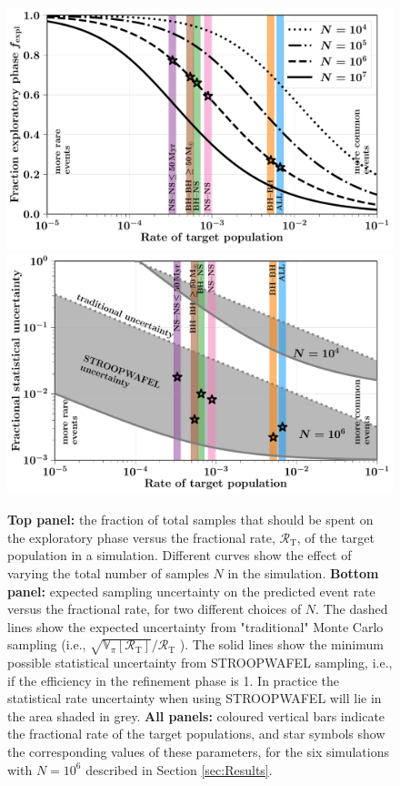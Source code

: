 \documentclass[a4paper,fleqn,usenatbib,useAMS,usedcolumn]{mnras}
\newcommand\rate{\mathcal{R}}
\newcommand{\AISs}{\textsc{STROOPWAFEL}}
\begin{document}
%
\begin{figure}
	\includegraphics[width=1\columnwidth]{AnalyticalFpriorIterated.pdf}
	\includegraphics[width=1\columnwidth]{AnalyticalFpriorIteratedUncertaintyCOMBINED.pdf}%
	    \caption{  	    
	    \textbf{Top panel:} the fraction of total samples that should be spent on the exploratory phase versus the fractional rate, $\rate_{\text{T}}$, of the target population in a simulation. Different curves show the effect of varying the total number of samples $N$ in the simulation. 
	    \textbf{Bottom panel:} expected sampling uncertainty on the predicted event rate versus the fractional rate, for two different choices of $N$. The dashed lines show the expected uncertainty from "traditional" Monte Carlo sampling (i.e., $\sqrt{{\mathbb{V}_{\pi}[\rate_{\text{T}}]}}/\rate_{\text{T}}$ ).  The solid lines show the minimum possible statistical uncertainty from \AISs{} sampling, i.e., if the efficiency in the refinement phase is 1.	 In practice the statistical rate uncertainty when using \AISs{} will lie in the area shaded in grey.  
	    \textbf{All panels:} coloured vertical bars indicate the fractional rate of the target populations, and star symbols show the corresponding values of these parameters, for the six simulations with $N= 10^6$ described in Section \ref{sec:Results}.}
    \label{fig:fractionPrior}
\end{figure}
%
\end{document}
